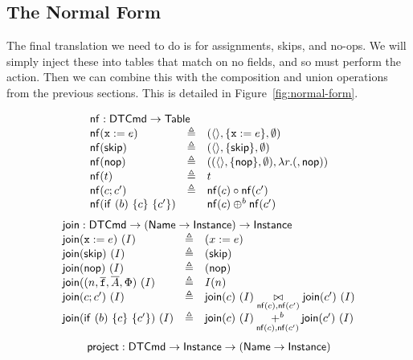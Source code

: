 \subsection{The Normal Form}

The final translation we need to do is for assignments, skips, and
no-ops. We will simply inject these into tables that match on no
fields, and so must perform the action. Then we can combine this with
the composition and union operations from the previous sections. This
is detailed in Figure~\ref{fig:normal-form}.

\begin{figure}[tp]
  \[
    \begin{array}{l c l}
      \multicolumn 3 l {\nf : \DTCmd \to \Table}\\
      \nf(\var x := e)
      &\triangleq
      &(\langle\rangle, \{\var x:=e\}, \emptyset) \\
      \nf(\SKIP)
      &\triangleq
      & (\langle\rangle, \{\SKIP\}, \emptyset) \\
      \nf(\nop)
      &\triangleq
      & ((\langle\rangle, \{\nop\}, \emptyset), \lambda r. (,\nop)) \\
      \nf(t)
      &\triangleq
      & t \\
      \nf(c;c')
      &\triangleq
      & \nf(c) \circ \nf(c') \\
      \nf (\ifte b c {c'})
      && \nf(c) \oplus^b \nf(c')
    \end{array}\]
  \[\begin{array}{lcl}
      \multicolumn 3 l {\join : \DTCmd \to (\Name \to \Instance) \to \Instance}\\
      \join(\var x := e)~(I)
      &\triangleq
      & (x:=e) \\
      \join(\SKIP)~(I)
      &\triangleq
      & (\SKIP) \\
      \join(\nop)~(I)
      & \triangleq
      & (\nop)\\
      \join((n, \vec{\var f}, \vec A, \Phi)~(I)
      &\triangleq
      & I(n)\\
      \join(c;c')~(I)
      &\triangleq
      & \join(c)~(I) \underset{\nf(c),\nf(c')}{\bowtie} \join(c')~(I)\\
      \join(\ifte b c {c'})~(I)
      &\triangleq 
      & \join(c)~(I) \underset{{\nf(c),\nf(c')}}{+^b}\join(c')~(I)
    \end{array}\]
  \[\begin{array}{lcl}        
      \multicolumn 3 l {\project : \DTCmd \to \Instance \to (\Name \to \Instance)}\\

\end{array}\]
\end{figure}
